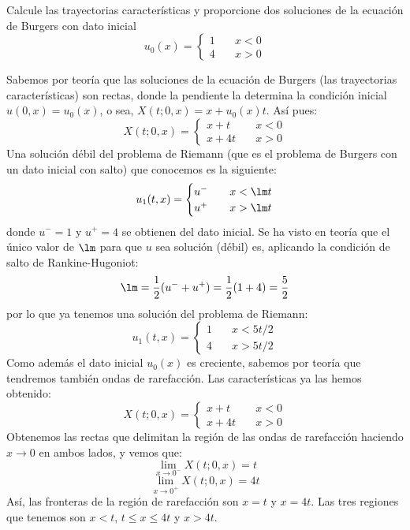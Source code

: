 \documentclass[12pt]{article}
\begin{document}
    \begin{ejercicio}
        Calcule las trayectorias características y proporcione dos soluciones de la ecuación de Burgers con dato inicial
        $$u_0(x) = \begin{cases}
            1 \quad& x<0 \\
            4 \quad& x>0
        \end{cases}$$

        Sabemos por teoría que las soluciones de la ecuación de Burgers (las trayectorias características) son rectas,
        donde la pendiente la determina la condición inicial $u(0,x) = u_0(x)$, o sea, $X(t;0,x) = x + u_0(x)t$. Así pues:
        $$X(t;0,x) = \begin{cases}
            x + t \quad& x < 0 \\
            x + 4t \quad& x > 0
        \end{cases}$$
        Una solución débil del problema de Riemann (que es el problema de Burgers con un dato inicial con salto) que conocemos es la siguiente:
        $$u_1(t,x) = \begin{cases}
            u^{-} \quad& x < \lm t \\
            u^{+} \quad& x > \lm t
        \end{cases}$$
        donde $u^{-} = 1$ y $u^{+} = 4$ se obtienen del dato inicial. Se ha visto en teoría que el único valor de $\lm$ para 
        que $u$ sea solución (débil) es, aplicando la condición de salto de Rankine-Hugoniot:
        $$\lm = \dfrac{1}{2}(u^{-} + u^{+}) = \dfrac{1}{2}(1+4) = \dfrac{5}{2}$$
        por lo que ya tenemos una solución del problema de Riemann: 
        $$\boxed{u_1(t,x) = \begin{cases}
            1 \quad& x < 5t/2 \\
            4 \quad& x > 5t/2
        \end{cases}}$$
        Como además el dato inicial $u_0(x)$ es creciente, sabemos por teoría que tendremos también ondas de rarefacción. Las características ya
        las hemos obtenido:
        $$X(t;0,x) = \begin{cases}
            x + t \quad& x < 0 \\
            x + 4t \quad& x > 0
        \end{cases}$$
        Obtenemos las rectas que delimitan la región de las ondas de rarefacción haciendo $x \to 0$ en ambos lados, y vemos que:
        $$\lim\limits_{x \to 0^{-}}X(t;0,x) = t$$
        $$\lim\limits_{x \to 0^{+}}X(t;0,x) = 4t$$
        Así, las fronteras de la región de rarefacción son $x = t$ y $x=4t$. Las tres regiones que tenemos son $x < t$, $t \leq x \leq 4t$ y $x > 4t$.

\end{ejercicio}
\end{document}
